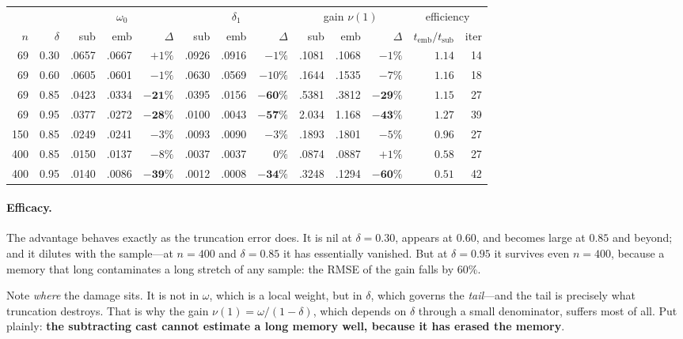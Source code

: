 \documentclass[11pt,a4paper]{article}
\theoremstyle{plain}
\theoremstyle{remark}
\begin{document}
\begin{center}
\begin{tabular}{rr rrr rrr rrr rr}
\toprule
 & & \multicolumn{3}{c}{$\omega_0$} & \multicolumn{3}{c}{$\delta_1$}
 & \multicolumn{3}{c}{gain $\nu(1)$} & \multicolumn{2}{c}{efficiency}\\
\cmidrule(lr){3-5}\cmidrule(lr){6-8}\cmidrule(lr){9-11}\cmidrule(lr){12-13}
$n$ & $\delta$ & sub & emb & $\Delta$ & sub & emb & $\Delta$ & sub & emb & $\Delta$
    & $t_{\text{emb}}/t_{\text{sub}}$ & iter \\
\midrule
 69 & 0.30 & .0657 & .0667 & $+1\%$ & .0926 & .0916 & $-1\%$   & .1081 & .1068 & $-1\%$  & $1.14$ & 14\\
 69 & 0.60 & .0605 & .0601 & $-1\%$ & .0630 & .0569 & $-10\%$  & .1644 & .1535 & $-7\%$  & $1.16$ & 18\\
 69 & 0.85 & .0423 & .0334 & $\mathbf{-21\%}$ & .0395 & .0156 & $\mathbf{-60\%}$ & .5381 & .3812 & $\mathbf{-29\%}$ & $1.15$ & 27\\
 69 & 0.95 & .0377 & .0272 & $\mathbf{-28\%}$ & .0100 & .0043 & $\mathbf{-57\%}$ & 2.034 & 1.168 & $\mathbf{-43\%}$ & $1.27$ & 39\\
\midrule
150 & 0.85 & .0249 & .0241 & $-3\%$ & .0093 & .0090 & $-3\%$ & .1893 & .1801 & $-5\%$ & $0.96$ & 27\\
400 & 0.85 & .0150 & .0137 & $-8\%$ & .0037 & .0037 & $0\%$  & .0874 & .0887 & $+1\%$ & $\mathbf{0.58}$ & 27\\
400 & 0.95 & .0140 & .0086 & $\mathbf{-39\%}$ & .0012 & .0008 & $\mathbf{-34\%}$ & .3248 & .1294 & $\mathbf{-60\%}$ & $\mathbf{0.51}$ & 42\\
\bottomrule
\end{tabular}
\end{center}

\paragraph{Efficacy.} The advantage behaves exactly as the truncation error does. It
is nil at $\delta=0.30$, appears at $0.60$, and becomes large at $0.85$ and beyond;
and it dilutes with the sample---at $n=400$ and $\delta=0.85$ it has essentially
vanished. But at $\delta=0.95$ it survives even $n=400$, because a memory that long
contaminates a long stretch of any sample: the RMSE of the gain falls by $60\%$.

Note \emph{where} the damage sits. It is not in $\omega$, which is a local weight,
but in $\delta$, which governs the \emph{tail}---and the tail is precisely what
truncation destroys. That is why the gain $\nu(1)=\omega/(1-\delta)$, which depends
on $\delta$ through a small denominator, suffers most of all. Put plainly:
\textbf{the subtracting cast cannot estimate a long memory well, because it has
erased the memory}.
\end{document}
